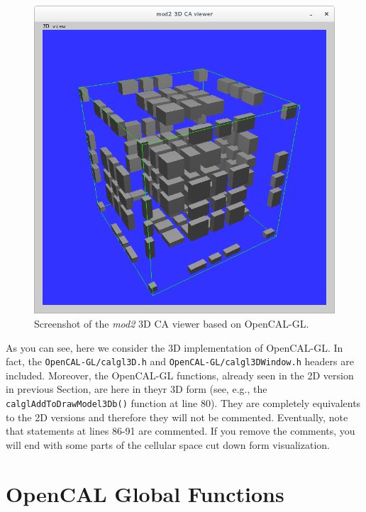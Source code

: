 

\begin{figure}
  \begin{center}
    \includegraphics[width=12cm]{./images/OpenCAL/calgl_mod2}
    \caption{Screenshot of the \emph{mod2} 3D CA viewer based on
      OpenCAL-GL.}
    \label{fig:calgl_mod2}
  \end{center}
\end{figure}

As you can see, here we consider the 3D implementation of
OpenCAL-GL. In fact, the \verb'OpenCAL-GL/calgl3D.h' and
\verb'OpenCAL-GL/calgl3DWindow.h' headers are included. Moreover, the
OpenCAL-GL functions, already seen in the 2D version in previous
Section, are here in theyr 3D form (see, e.g., the
\verb'calglAddToDrawModel3Db()' function at line 80). They are
completely equivalents to the 2D versions and therefore they will not
be commented. Eventually, note that statements at lines 86-91 are
commented. If you remove the comments, you will end with some parts of
the cellular space cut down form visualization.


\section{OpenCAL Global Functions}\label{sec:redution}

